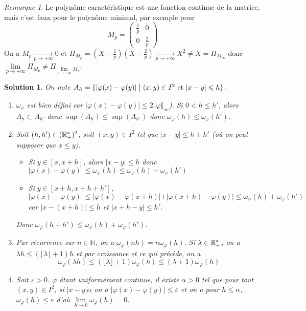 \documentclass[12pt]{article}
\newtheorem{solution}{Solution}[section]
\theoremstyle{remark}
\newtheorem{remark}{Remarque}[section]
\newcommand{\N}{\mathbb{N}} \newcommand{\Z}{\mathbb{Z}}
\numberwithin{equation}{section}
\begin{document}
\begin{remark}
	Le polynôme caractéristique est une fonction continue de la matrice, mais c'est faux pour le polynôme minimal, par exemple pour 
	$$M_{p}=\begin{pmatrix}
		\frac{1}{p} &0\\
		0 & \frac{2}{p}
	\end{pmatrix}$$
	On a $M_{p}\xrightarrow[p\to+\infty]{}0$ et $\Pi_{M_{p}}=(X-\frac{1}{p})(X-\frac{2}{p})\xrightarrow[p\to+\infty]{} X^{2}\neq X=\Pi_{M_{\infty}}$ donc $\lim\limits_{p\to+\infty}\Pi_{M_p}\neq\Pi_{\lim\limits_{p\to+\infty}M_{p}}$.
\end{remark}

\begin{solution}
	On note $A_{h}=\{\vert\varphi(x)-\varphi(y)\vert\bigm|(x,y)\in I^{2}\text{ et }\vert x-y\vert\leqslant h\}$.
	\begin{enumerate}
		\item $\omega_{\varphi}$ est bien défini car $\vert\varphi(x)-\varphi(y)\vert\leqslant 2\Vert\varphi\Vert_{\infty}$). Si $0<h\leqslant h'$, alors $A_{h}\subset A_{h'}$ donc $\sup(A_{h})\leqslant\sup(A_{h'})$ donc $\omega_{\varphi}(h)\leqslant\omega_{\varphi}(h')$.
		\item Soit $(h,h')\in(\mathbb{R}_{+}^{*})^{2}$, soit $(x,y)\in I^{2}$ tel que $\vert x-y\vert\leqslant h+h'$ (où on peut supposer que $x\leqslant y$).
		\begin{itemize}
			\item Si $y\in[x,x+h]$, alors $\vert x-y\vert\leqslant h$ donc $\vert\varphi(x)-\varphi(y)\vert\leqslant\omega_{\varphi}(h)\leqslant\omega_\varphi(h)+\omega_{\varphi}(h')$
			\item Si $y\in[x+h,x+h+h']$, $\vert\varphi(x)-\varphi(y)\vert\leqslant\vert\varphi(x)-\varphi(x+h)\vert+\vert\varphi(x+h)-\varphi(y)\vert\leqslant\omega_\varphi(h)+\omega_{\varphi}(h')$ car $\vert x-(x+h)\vert\leqslant h$ et $\vert x+h-y\vert\leqslant h'$.
		\end{itemize}
		Donc $\omega_{\varphi}(h+h')\leqslant\omega_\varphi(h)+\omega_\varphi(h')$.
		\item Par récurrence sur $n\in\N$, on a $\omega_\varphi(nh)=n\omega_\varphi(h)$. Si $\lambda\in\mathbb{R}_{+}^{*}$, on a $\lambda h\leqslant(\lfloor \lambda\rfloor+1)h$ et par croissance et ce qui précède, on a 
		$$\omega_\varphi(\lambda h)\leqslant(\lfloor\lambda\rfloor+1)\omega_\varphi(h)\leqslant(\lambda+1)\omega_\varphi(h)$$
		\item Soit $\varepsilon>0$. $\varphi$ étant uniformément continue, il existe $\alpha>0$ tel que pour tout $(x,y)\in I^{2}$, si $\vert x-y\vert\alpha$ on a $\vert\varphi(x)-\varphi(y)\vert\leqslant\varepsilon$ et on a pour $h\leqslant\alpha$, $\omega_\varphi(h)\leqslant\varepsilon$ d'où $\lim\limits_{h\to0}\omega_\varphi(h)=0$.
		

\end{enumerate}
\end{solution}
\end{document}
